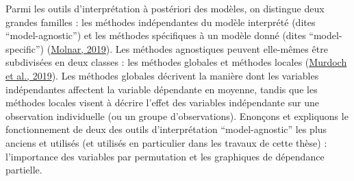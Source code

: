 \documentclass[12pt,twoside]{reedthesis}
\begin{document}
Parmi les outils d'interprétation à postériori des modèles, on distingue deux grandes familles : les méthodes indépendantes du modèle interprété (dites ``model-agnostic'') et les méthodes spécifiques à un modèle donné (dites ``model-specific'') (\protect\hyperlink{ref-molnar_interpretable_2019}{Molnar, 2019}). Les méthodes agnostiques peuvent elle-mêmes être subdivisées en deux classes : les méthodes globales et méthodes locales (\protect\hyperlink{ref-murdoch_definitions_2019}{Murdoch et al., 2019}). Les méthodes globales décrivent la manière dont les variables indépendantes affectent la variable dépendante en moyenne, tandis que les méthodes locales visent à décrire l'effet des variables indépendante sur une observation individuelle (ou un groupe d'observations). Enonçons et expliquons le fonctionnement de deux des outils d'interprétation ``model-agnostic'' les plus anciens et utilisés (et utilisés en particulier dans les travaux de cette thèse) : l'importance des variables par permutation et les graphiques de dépendance partielle.\\
\end{document}
